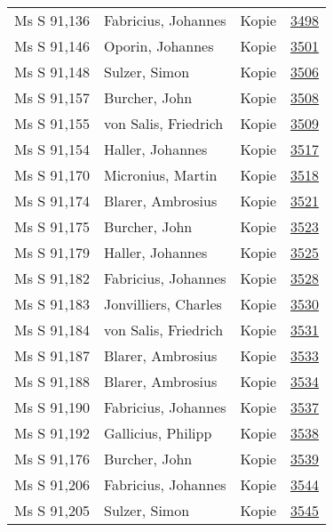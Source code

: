 \documentclass[10pt,a4paper,landscape]{report}
\begin{document}
\begin{longtable}{p{16cm}p{4cm}lr}
Ms S 91,136	&	Fabricius, Johannes	&	Kopie	&	\href{http://130.60.24.72/assignment/3498}{3498}\\
Ms S 91,146	&	Oporin, Johannes	&	Kopie	&	\href{http://130.60.24.72/assignment/3501}{3501}\\
Ms S 91,148	&	Sulzer, Simon	&	Kopie	&	\href{http://130.60.24.72/assignment/3506}{3506}\\
Ms S 91,157	&	Burcher, John	&	Kopie	&	\href{http://130.60.24.72/assignment/3508}{3508}\\
Ms S 91,155	&	von Salis, Friedrich	&	Kopie	&	\href{http://130.60.24.72/assignment/3509}{3509}\\
Ms S 91,154	&	Haller, Johannes	&	Kopie	&	\href{http://130.60.24.72/assignment/3517}{3517}\\
Ms S 91,170	&	Micronius, Martin	&	Kopie	&	\href{http://130.60.24.72/assignment/3518}{3518}\\
Ms S 91,174	&	Blarer, Ambrosius	&	Kopie	&	\href{http://130.60.24.72/assignment/3521}{3521}\\
Ms S 91,175	&	Burcher, John	&	Kopie	&	\href{http://130.60.24.72/assignment/3523}{3523}\\
Ms S 91,179	&	Haller, Johannes	&	Kopie	&	\href{http://130.60.24.72/assignment/3525}{3525}\\
Ms S 91,182	&	Fabricius, Johannes	&	Kopie	&	\href{http://130.60.24.72/assignment/3528}{3528}\\
Ms S 91,183	&	Jonvilliers, Charles	&	Kopie	&	\href{http://130.60.24.72/assignment/3530}{3530}\\
Ms S 91,184	&	von Salis, Friedrich	&	Kopie	&	\href{http://130.60.24.72/assignment/3531}{3531}\\
Ms S 91,187	&	Blarer, Ambrosius	&	Kopie	&	\href{http://130.60.24.72/assignment/3533}{3533}\\
Ms S 91,188	&	Blarer, Ambrosius	&	Kopie	&	\href{http://130.60.24.72/assignment/3534}{3534}\\
Ms S 91,190	&	Fabricius, Johannes	&	Kopie	&	\href{http://130.60.24.72/assignment/3537}{3537}\\
Ms S 91,192	&	Gallicius, Philipp	&	Kopie	&	\href{http://130.60.24.72/assignment/3538}{3538}\\
Ms S 91,176	&	Burcher, John	&	Kopie	&	\href{http://130.60.24.72/assignment/3539}{3539}\\
Ms S 91,206	&	Fabricius, Johannes	&	Kopie	&	\href{http://130.60.24.72/assignment/3544}{3544}\\
Ms S 91,205	&	Sulzer, Simon	&	Kopie	&	\href{http://130.60.24.72/assignment/3545}{3545}\\

\end{longtable}
\end{document}
